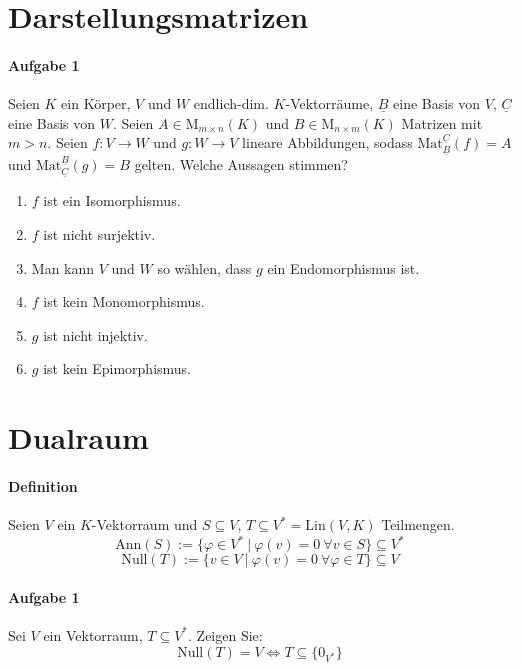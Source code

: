 \documentclass{scrartcl}
\begin{document}
	\section{Darstellungsmatrizen}
	\paragraph{Aufgabe 1}
	Seien $K$ ein Körper, $V$ und $W$ endlich-dim. $K$-Vektorräume,
	$\underline{B}$ eine Basis von $V$, $\underline{C}$ eine Basis von $W$.
	Seien $A\in\text{M}_{m\times n}(K)$ und $B\in\text{M}_{n\times m}(K)$ Matrizen mit $m>n$.
	Seien $f: V\to W$ und $g: W\to V$ lineare Abbildungen, sodass $\text{Mat}_{\underline{B}}^{\underline{C}}(f)=A$
	und $\text{Mat}_{\underline{C}}^{\underline{B}}(g)=B$ gelten.
	Welche Aussagen stimmen?
	\begin{enumerate}[label=(\alph*)]
		\item $f$ ist ein Isomorphismus.
		\item $f$ ist nicht surjektiv.
		\item Man kann $V$ und $W$ so wählen, dass $g$ ein Endomorphismus ist.
		\item $f$ ist kein Monomorphismus.
		\item $g$ ist nicht injektiv.
		\item $g$ ist kein Epimorphismus.
	\end{enumerate}
	\section{Dualraum}
	\paragraph{Definition}
	Seien $V$ ein $K$-Vektorraum und $S\subseteq V$, $T\subseteq V^*=\text{Lin}(V,K)$ Teilmengen.
	\[\text{Ann}(S):=\{\varphi\in V^*\ \vert\ \varphi(v)=0\ \forall v\in S\}\subseteq V^*\]
	\[\text{Null}(T):=\{v\in V\ \vert\ \varphi(v)=0\ \forall\varphi\in T\}\subseteq V\]
	\paragraph{Aufgabe 1}
	Sei $V$ ein Vektorraum, $T\subseteq V^*$. Zeigen Sie:
	\[\text{Null}(T)=V\Leftrightarrow T\subseteq\{0_{V^*}\}\]
\end{document}
